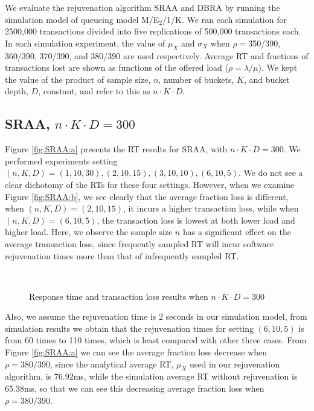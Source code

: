 \documentclass[10pt,journal,letterpaper,compsoc]{IEEEtran}
\begin{document}
We evaluate the rejuvenation algorithm SRAA and DBRA
by running the simulation model of queueing model M/E$_2$/1/K.
We ran each simulation for 2500,000 transactions divided into
five replications of 500,000 transactions each.
In each simulation experiment, the value of $\mu_X$ and $\sigma_X$
when  $\rho=$350/390, 360/390, 370/390, and 380/390 are used respectively.
Average RT and fractions of transactions lost are shown as functions
of the offered load ($\rho=\lambda/\mu$).
We kept the value of the product of sample size, $n$, number of buckets,
$K$, and bucket depth, $D$, constant,
and refer to this as $n\cdot K\cdot D$.

\subsection{SRAA, $n\cdot K\cdot D=300$} %
\label{subsec:SRAAnKD300}
Figure \ref{fig:SRAA:a} presents the RT results for SRAA,
with $n\cdot K\cdot D=300$.
We performed experiments setting
$(n, K, D)=(1, 10, 30), (2, 10, 15), (3, 10, 10), (6, 10, 5)$.
We do not see a clear dichotomy of the RTs for these four settings.
However, when we examine Figure \ref{fig:SRAA:b},
we see clearly that the average fraction loss is different,
when $(n, K, D)=(2, 10, 15)$, it incurs a higher transaction loss, while
when $(n, K, D)=(6, 10, 5)$, the transaction loss is lowest at both
lower load and higher load.
Here, we observe the sample size $n$ has a significant effect on
the average transaction loss, since frequently sampled RT will incur
software rejuvenation times more than that of infrequently sampled RT.

\begin{figure}[htb]
\centering
{}
\\
\caption{Response time and transaction loss results when $n\cdot K\cdot D=300$}
\label{fig:SRAA}
\end{figure}

Also, we assume the rejuvenation time is 2 seconds in our simulation model,
from simulation results we obtain that the rejuvenation times
for setting $(6, 10, 5)$ is from 60 times to 110 times,
which is least compared with other three cases.
From Figure \ref{fig:SRAA:a} we can see the average fraction loss
decrease when $\rho=380/390$, since the analytical average RT,
$\mu_X$ used in our rejuvenation algorithm, is 76.92ms,
while the simulation average RT without rejuvenation is 65.38ms,
so that we can see this decreasing average
fraction loss when $\rho=380/390$.
\end{document}
